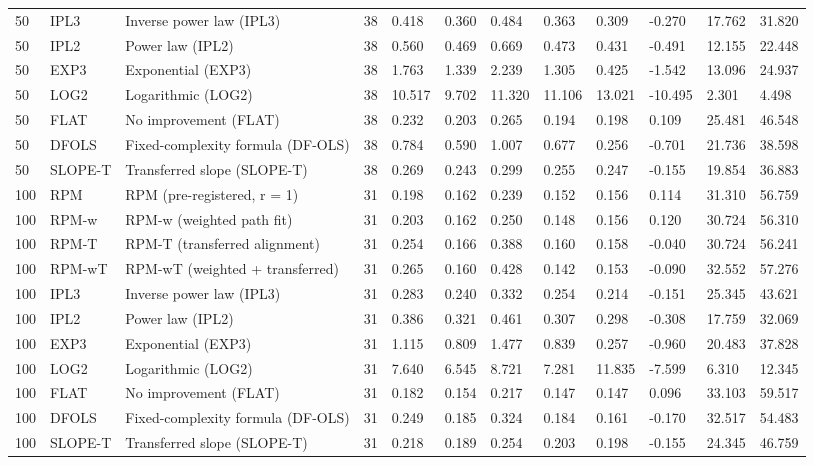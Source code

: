 \begin{tabular}{llllllllllll}
50 & IPL3 & Inverse power law (IPL3) & 38 & 0.418 & 0.360 & 0.484 & 0.363 & 0.309 & -0.270 & 17.762 & 31.820 \\
50 & IPL2 & Power law (IPL2) & 38 & 0.560 & 0.469 & 0.669 & 0.473 & 0.431 & -0.491 & 12.155 & 22.448 \\
50 & EXP3 & Exponential (EXP3) & 38 & 1.763 & 1.339 & 2.239 & 1.305 & 0.425 & -1.542 & 13.096 & 24.937 \\
50 & LOG2 & Logarithmic (LOG2) & 38 & 10.517 & 9.702 & 11.320 & 11.106 & 13.021 & -10.495 & 2.301 & 4.498 \\
50 & FLAT & No improvement (FLAT) & 38 & 0.232 & 0.203 & 0.265 & 0.194 & 0.198 & 0.109 & 25.481 & 46.548 \\
50 & DFOLS & Fixed-complexity formula (DF-OLS) & 38 & 0.784 & 0.590 & 1.007 & 0.677 & 0.256 & -0.701 & 21.736 & 38.598 \\
50 & SLOPE-T & Transferred slope (SLOPE-T) & 38 & 0.269 & 0.243 & 0.299 & 0.255 & 0.247 & -0.155 & 19.854 & 36.883 \\
100 & RPM & RPM (pre-registered, r = 1) & 31 & 0.198 & 0.162 & 0.239 & 0.152 & 0.156 & 0.114 & 31.310 & 56.759 \\
100 & RPM-w & RPM-w (weighted path fit) & 31 & 0.203 & 0.162 & 0.250 & 0.148 & 0.156 & 0.120 & 30.724 & 56.310 \\
100 & RPM-T & RPM-T (transferred alignment) & 31 & 0.254 & 0.166 & 0.388 & 0.160 & 0.158 & -0.040 & 30.724 & 56.241 \\
100 & RPM-wT & RPM-wT (weighted + transferred) & 31 & 0.265 & 0.160 & 0.428 & 0.142 & 0.153 & -0.090 & 32.552 & 57.276 \\
100 & IPL3 & Inverse power law (IPL3) & 31 & 0.283 & 0.240 & 0.332 & 0.254 & 0.214 & -0.151 & 25.345 & 43.621 \\
100 & IPL2 & Power law (IPL2) & 31 & 0.386 & 0.321 & 0.461 & 0.307 & 0.298 & -0.308 & 17.759 & 32.069 \\
100 & EXP3 & Exponential (EXP3) & 31 & 1.115 & 0.809 & 1.477 & 0.839 & 0.257 & -0.960 & 20.483 & 37.828 \\
100 & LOG2 & Logarithmic (LOG2) & 31 & 7.640 & 6.545 & 8.721 & 7.281 & 11.835 & -7.599 & 6.310 & 12.345 \\
100 & FLAT & No improvement (FLAT) & 31 & 0.182 & 0.154 & 0.217 & 0.147 & 0.147 & 0.096 & 33.103 & 59.517 \\
100 & DFOLS & Fixed-complexity formula (DF-OLS) & 31 & 0.249 & 0.185 & 0.324 & 0.184 & 0.161 & -0.170 & 32.517 & 54.483 \\
100 & SLOPE-T & Transferred slope (SLOPE-T) & 31 & 0.218 & 0.189 & 0.254 & 0.203 & 0.198 & -0.155 & 24.345 & 46.759 \\

\end{tabular}
